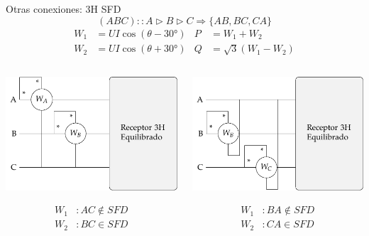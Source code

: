 \documentclass[aspectratio=169, usenames,svgnames,dvipsnames]{beamer}
\begin{document}
\begin{frame}[label={sec:org6eb96ac},plain]{Otras conexiones: 3H SFD}
\[
  \boxed{(ABC) :: A \triangleright B \triangleright C \Longrightarrow \{AB, BC, CA\}}
\]
\begin{align*}
  W_1 &= UI\cos(\theta - \ang{30}) & P &= W_1 + W_2\\
  W_2 &= UI\cos(\theta + \ang{30}) & Q &= \sqrt{3}(W_1 - W_2)
\end{align*}
\begin{columns}
\begin{column}{0.33\columnwidth}
\begin{center}
\includegraphics[width=.9\linewidth]{../figs/Potencia3H_Equilibrado_AB.pdf}
\end{center}
\begin{align*}
  W_1&: AC \notin SFD\\
  W_2&: BC \in SFD\\
\end{align*}
\end{column}
\begin{column}{0.33\columnwidth}
\begin{center}
\includegraphics[width=.9\linewidth]{../figs/Potencia3H_Equilibrado_BC.pdf}
\end{center}
\begin{align*}
  W_1&: BA \notin SFD\\
  W_2&: CA \in SFD\\
\end{align*}
\end{column}


\end{columns}
\end{frame}
\end{document}
